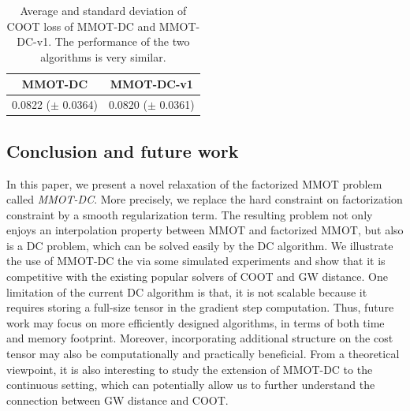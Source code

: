 \begin{table}[H]
  \label{tab:coot_new}
  \begin{center}
    \begin{small}
      \begin{sc}
        \begin{tabular}{|c|c|}
          \hline
          MMOT-DC & MMOT-DC-v1 \\
          \hline
          0.0822 ($\pm$ 0.0364) & 0.0820 ($\pm$ 0.0361) \\
          \hline
        \end{tabular}
      \end{sc}
    \end{small}
  \end{center}
  \caption{Average and standard deviation of COOT loss of MMOT-DC and MMOT-DC-v1. The performance of the two algorithms is
  very similar.}
\end{table}

\subsection{Conclusion and future work}

In this paper, we present a novel relaxation of the factorized MMOT problem called \textit{MMOT-DC}.
More precisely, we replace the
hard constraint on factorization constraint by a smooth regularization term. The resulting problem
not only enjoys an interpolation property between MMOT and factorized MMOT, but also is a DC problem,
which can be solved easily by the DC algorithm. We illustrate the use of MMOT-DC the via some simulated experiments and show that
it is competitive with the existing popular solvers of COOT and GW distance.
One limitation of the current DC algorithm is that, it is not scalable because
it requires storing a full-size tensor in the gradient step computation. Thus, future
work may focus on more efficiently designed algorithms, in terms of both time and memory footprint.
Moreover, incorporating additional structure on the cost tensor may also be computationally and practically beneficial.
From a theoretical viewpoint, it is also interesting to study the extension of MMOT-DC to the continuous setting,
which can potentially allow us to further understand the connection between GW distance and COOT.


